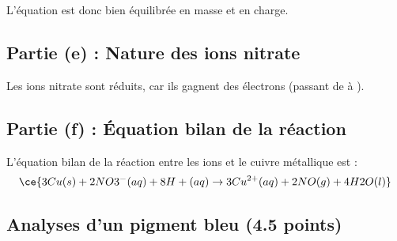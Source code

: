 \documentclass[answers]{exam}
\begin{document}
\begin{solution}
L'équation est donc bien équilibrée en masse et en charge.

\subsection*{Partie (e) : Nature des ions nitrate}

Les ions nitrate sont réduits, car ils gagnent des électrons (passant de  à ).

\subsection*{Partie (f) : Équation bilan de la réaction}

L'équation bilan de la réaction entre les ions  et le cuivre métallique est :
\[
\ce{3 Cu(s) + 2 NO3^- (aq) + 8 H+ (aq) \rightarrow 3 Cu^{2+}(aq) + 2 NO (g) + 4 H2O (l)}
\]

\end{solution}

\subsection*{Analyses d'un pigment bleu (4.5 points)}
\end{document}
